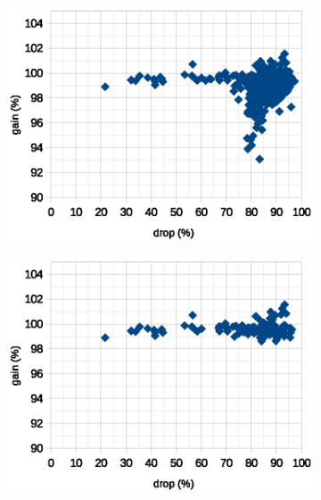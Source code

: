 \documentclass[12pt]{report}
\begin{document}
\begin{figure}[h!]
\begin{subfigure}[b]{0.49\linewidth}
		\includegraphics[scale=0.7]{dia/all_first.eps}
	\end{subfigure}
	\begin{subfigure}[b]{0.49\linewidth}
		\centering
		\includegraphics[scale=0.7]{dia/best_first.eps}
	\end{subfigure}
	\caption{First layer plot}
	\label{first_layer}
	\begin{subfigure}[b]{0.49\linewidth}
		\centering

\end{subfigure}
\end{figure}
\end{document}
